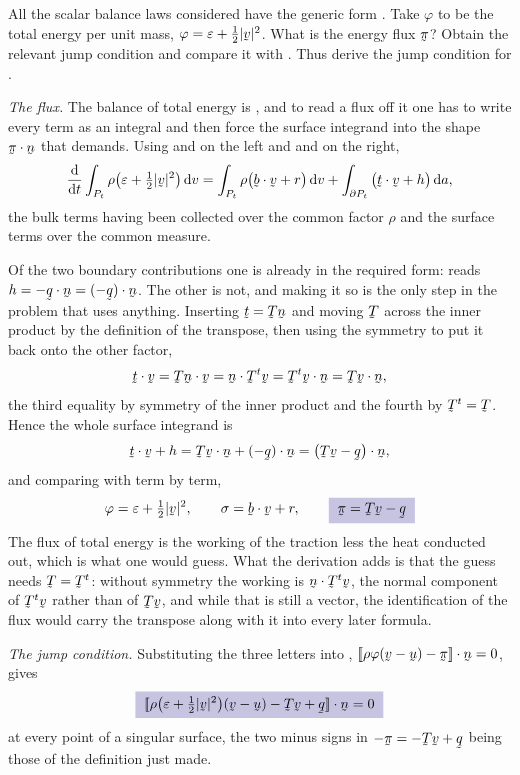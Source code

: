\begin{problem}
All the scalar balance laws considered have the generic form .
Take $\varphi$ to be the total energy per unit mass,
$\varphi=\varepsilon+\tfrac12|\bv|^{2}$. What is the energy flux
$\vek\pi$? Obtain the relevant jump condition and compare it with
. Thus derive the jump condition for .
\end{problem}

\begin{solution}
\noindent\emph{The flux.}
The balance of total energy is , and to read a flux off it
one has to write every term as an integral and then force the surface
integrand into the shape $\ip{\vek\pi}\bn$ that  demands.
Using  and  on the left and  and
 on the right,
\[
   \frac{\dl}{\dl t}\int_{P_{t}}\rho
   \big(\varepsilon+\tfrac12|\bv|^{2}\big)\,\dl v
   =\int_{P_{t}}\rho\big(\ip\bb\bv+r\big)\,\dl v
   +\int_{\partial P_{t}}\big(\ip\bt\bv+h\big)\,\dl a ,
\]
the bulk terms having been collected over the common factor $\rho$ and
the surface terms over the common measure.

Of the two boundary contributions one is already in the required form:
 reads $h=-\ip\bq\bn=\ip{(-\bq)}\bn$. The other is not, and
making it so is the only step in the problem that uses anything.
Inserting $\bt=\bT\bn$ and moving $\bT$ across the inner product by the
definition of the transpose, then using the symmetry  to put
it back onto the other factor,
\[
   \ip\bt\bv=\ip{\bT\bn}\bv=\ip\bn{\bT^{t}\bv}
   =\ip{\bT^{t}\bv}\bn
   =\ip{\bT\bv}\bn ,
\]
the third equality by symmetry of the inner product and the fourth by
$\bT^{t}=\bT$. Hence the whole surface integrand is
\[
   \ip\bt\bv+h=\ip{\bT\bv}\bn+\ip{(-\bq)}\bn
   =\ip{\big(\bT\bv-\bq\big)}\bn ,
\]
and comparing with  term by term,
\[
   \varphi=\varepsilon+\tfrac12|\bv|^{2},\qquad
   \sigma=\ip\bb\bv+r,\qquad
   \boxed{\;\vek\pi=\bT\bv-\bq\;}
\]
The flux of total energy is the working of the traction less the heat
conducted out, which is what one would guess. What the derivation adds
is that the guess needs $\bT=\bT^{t}$: without symmetry the working is
$\ip\bn{\bT^{t}\bv}$, the normal component of $\bT^{t}\bv$ rather than
of $\bT\bv$, and while that is still a vector, the identification of
the flux would carry the transpose along with it into every later
formula.

\medskip
\noindent\emph{The jump condition.}
Substituting the three letters into ,
$\ip{\jump{\rho\varphi(\bv-\bu)-\vek\pi}}\bn=0$, gives
\[
   \boxed{\;\jump{\rho\big(\varepsilon+\tfrac12|\bv|^{2}\big)(\bv-\bu)
   -\bT\bv+\bq}\cdot\bn=0\;}
\]
at every point of a singular surface, the two minus signs in
$-\vek\pi=-\bT\bv+\bq$ being those of the definition just made.


\end{solution}
